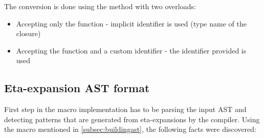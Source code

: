 The conversion is done using the  method with two overloads:
\begin{itemize}
	\item Accepting only the function - implicit identifier is used (type name of the closure)
	\item Accepting the function and a custom identifier - the identifier provided is used
\end{itemize}

\subsection{Eta-expansion AST format}

First step in the macro implementation has to be parsing the input AST and detecting patterns that are generated from eta-expansions by the compiler. Using the  macro mentioned in \ref{subsec:buildingast}, the following facts were discovered:

